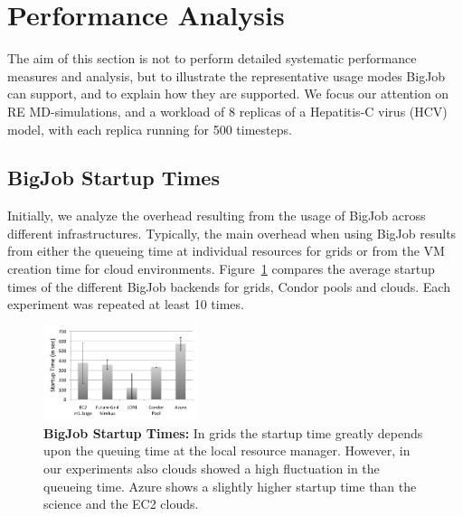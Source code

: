 \documentclass[conference,final]{IEEEtran}
\newcommand{\up}{\vspace*{-1em}}
\newcommand{\numrep}{8 }
\newcommand{\alnote}[1]{ {\textcolor{blue} { ***AL: #1 }}}
\newcommand{\jhanote}[1]{ {\textcolor{red} { ***SJ: #1 }}}
\newcommand{\alnote}[1]{}
\newcommand{\jhanote}[1]{}
\begin{document}
\up
\section{Performance Analysis}
\label{sec:performance}
\up The aim of this section is not to perform detailed systematic
performance measures and analysis, but to illustrate the
representative usage modes BigJob can support, and to explain how they
are supported.  %
We focus our attention on RE MD-simulations, and a workload of \numrep
replicas of a Hepatitis-C virus (HCV) model, with each replica running
for 500 timesteps.  \up

\subsection{BigJob Startup Times}
\up Initially, we analyze the overhead resulting from the usage of
BigJob across different infrastructures. Typically, the main overhead
when using BigJob results from either the queueing time at individual
resources for grids or from the VM creation time for cloud
environments.  Figure~\ref{fig:performance_setup_time} compares the
average startup times of the different BigJob
backends %
for grids, Condor pools and clouds. Each experiment was repeated at
least 10 times.

\begin{figure}[htbp]
    \centering
        \includegraphics[width=0.4\textwidth]{performance/setup-times}
    \caption{\textbf{BigJob Startup Times:} In grids the startup time
      greatly depends upon the queuing time at the local resource
      manager. However, in our experiments also clouds showed a high
      fluctuation in the queueing time. Azure shows a slightly higher
      startup time than the science and the EC2 clouds.\up}
    \label{fig:performance_setup_time}
\end{figure}
\end{document}
